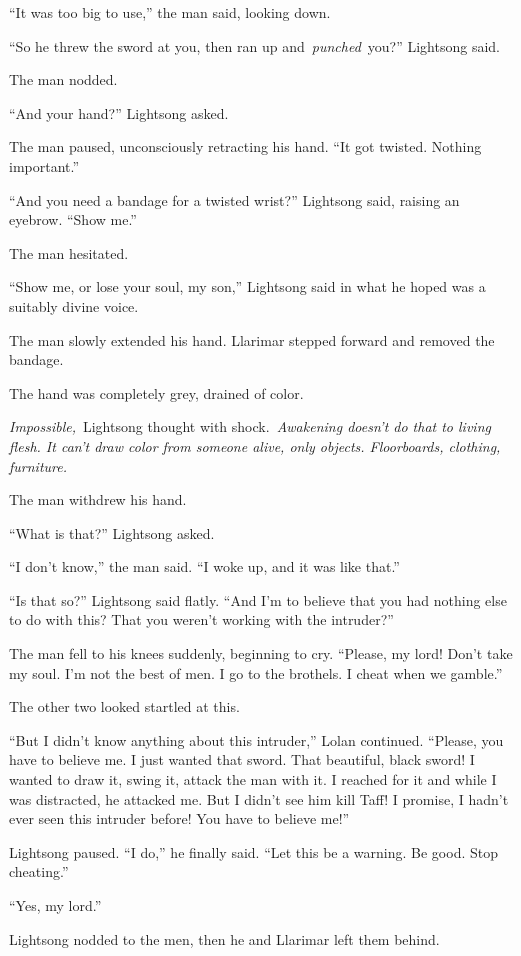 “It was too big to use,” the man said, looking down.

“So he threw the sword at you, then ran up and~\textit{punched}~you?” Lightsong said.

The man nodded.

“And your hand?” Lightsong asked.

The man paused, unconsciously retracting his hand. “It got twisted. Nothing important.”

“And you need a bandage for a twisted wrist?” Lightsong said, raising an eyebrow. “Show me.”

The man hesitated.

“Show me, or lose your soul, my son,” Lightsong said in what he hoped was a suitably divine voice.

The man slowly extended his hand. Llarimar stepped forward and removed the bandage.

The hand was completely grey, drained of color.

\textit{Impossible,}~Lightsong thought with shock.~\textit{Awakening doesn’t do that to living flesh. It can’t draw color from someone alive, only objects. Floorboards, clothing, furniture.}

The man withdrew his hand.

“What is that?” Lightsong asked.

“I don’t know,” the man said. “I woke up, and it was like that.”

“Is that so?” Lightsong said flatly. “And I’m to believe that you had nothing else to do with this? That you weren’t working with the intruder?”

The man fell to his knees suddenly, beginning to cry. “Please, my lord! Don’t take my soul. I’m not the best of men. I go to the brothels. I cheat when we gamble.”

The other two looked startled at this.

“But I didn’t know anything about this intruder,” Lolan continued. “Please, you have to believe me. I just wanted that sword. That beautiful, black sword! I wanted to draw it, swing it, attack the man with it. I reached for it and while I was distracted, he attacked me. But I didn’t see him kill Taff! I promise, I hadn’t ever seen this intruder before! You have to believe me!”

Lightsong paused. “I do,” he finally said. “Let this be a warning. Be good. Stop cheating.”

“Yes, my lord.”

Lightsong nodded to the men, then he and Llarimar left them behind.

